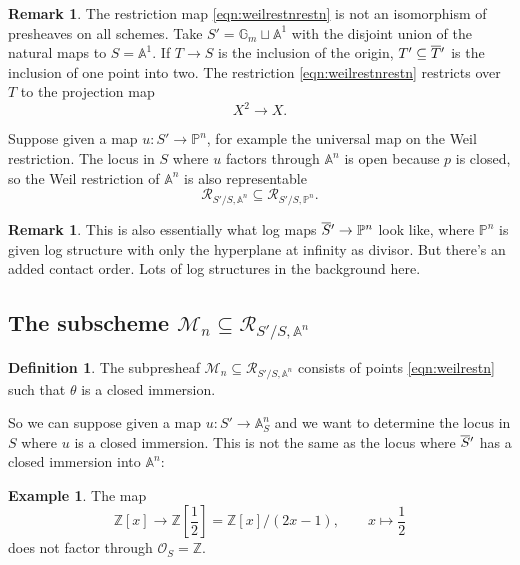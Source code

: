 \documentclass[11pt,reqno]{amsart}
\theoremstyle{definition}
\newtheorem{definition}[theorem]{Definition}
\newtheorem{example}[theorem]{Example}
\newtheorem{remark}[theorem]{Remark}
\newcommand{\ZZ}{\mathbb{Z}}
\newcommand{\OO}{\mathcal{O}}
\newcommand{\Aff}{{\mathbb{A}}}
\newcommand{\PP}{\mathbb{P}}
\newcommand{\GG}{\mathbb{G}}
\def\overnorm#1{\overline{#1}\vphantom{#1}}
\renewcommand{\bar}[1]{\ensuremath{\overnorm{#1}}}
\newcommand{\WR}{\cal R}
\newcommand{\Gen}{\cal M}
\newcommand{\bra}[1]{\left[{#1}\right]}
\newcommand{\cal}[1]{\ensuremath{\mathcal{#1}}}
\newcommand{\Leo}[2][inline]{\todo[linecolor=blue,backgroundcolor=blue!25,bordercolor=blue,#1,shadow,author=Leo]{#2}} %
\begin{document}
\begin{remark}

The restriction map \eqref{eqn:weilrestnrestn} is not an isomorphism of presheaves on all schemes. Take $S' = \GG_m \sqcup \Aff^1$ with the disjoint union of the natural maps to $S = \Aff^1$. If $T \to S$ is the inclusion of the origin, $T' \subseteq \bar T'$ is the inclusion of one point into two. The restriction \eqref{eqn:weilrestnrestn} restricts over $T$ to the projection map
\[X^2 \to X.\] 

\end{remark}


Suppose given a map $u : S' \to \PP^n$, for example the universal map on the Weil restriction. The locus in $S$ where $u$ factors through $\Aff^n$ is open because $p$ is closed, so the Weil restriction of $\Aff^n$ is also representable
\[\WR_{S'/S, \Aff^n} \subseteq \WR_{S'/S, \PP^n}.\]

\begin{remark}

This is also essentially what log maps $\bar S' \to \PP^n$ look like, where $\PP^n$ is given log structure with only the hyperplane at infinity as divisor. But there's an added contact order. Lots of log structures in the background here. 

\end{remark}




\subsection{The subscheme $\Gen_n \subseteq \WR_{S'/S, \Aff^n}$}


\begin{definition}

The subpresheaf $\Gen_n \subseteq \WR_{S'/S, \Aff^n}$ consists of points \eqref{eqn:weilrestn} such that $\theta$ is a closed immersion. 

\end{definition}





So we can suppose given a map $u : S' \to \Aff^n_S$ and we want to determine the locus in $S$ where $u$ is a closed immersion. This is not the same as the locus where $\bar S'$ has a closed immersion into $\Aff^n$: 

\begin{example}

The map
\[\ZZ[x] \to \ZZ \bra{\dfrac{1}{2}} = \ZZ[x]/(2x-1), \qquad x \mapsto \dfrac{1}{2}\]
does not factor through $\OO_S = \ZZ$. 
\Leo{But it does if you extend to $\PP^1$}


\end{example}
	
\end{document}
